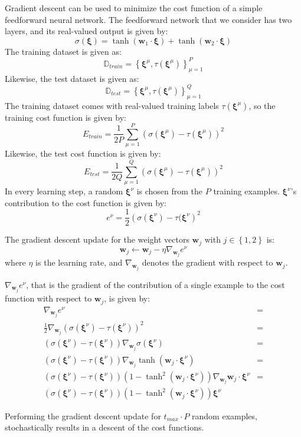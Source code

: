 Gradient descent can be used to minimize the cost function of a simple feedforward neural network.
The feedforward network that we consider has two layers, and its real-valued output is given by:
\[
	\sigma(\pmb{\xi}) = 
	\tanh(\mathbf{w}_1\cdot \pmb{\xi}) + \tanh(\mathbf{w}_2\cdot \pmb{\xi})
\]
The training dataset is given as:
\[
\mathbb{D}_{train} =
	\left\{
		\pmb{\xi}^\mu, \tau(\pmb{\xi}^\mu)
	\right\}_{\mu=1}^{P}
\]
Likewise, the test dataset is given as:
\[
\mathbb{D}_{test} =
	\left\{
		\pmb{\xi}^\mu, \tau(\pmb{\xi}^\mu)
	\right\}_{\mu=1}^{Q}
\]
The training dataset comes with real-valued training labels \(\tau(\pmb{\xi}^\mu)\), so the training cost function is given by:
\[
	E_{train} = 
	\frac{1}{2P}
	\sum_{\mu=1}^P(\sigma(\pmb{\xi}^\mu) - \tau(\pmb{\xi}^\mu))^2
\]
Likewise, the test cost function is given by:
\[
	E_{test} = 
	\frac{1}{2Q}
	\sum_{\mu=1}^Q(\sigma(\pmb{\xi}^\mu) - \tau(\pmb{\xi}^\mu))^2
\]
In every learning step, a random \(\pmb{\xi}^\nu\) is chosen from the \(P\) training examples.
\(\pmb{\xi}^\nu\)'s contribution to the cost function is given by:
\[
	e^\nu = 
	\frac{1}{2}\left(
		\sigma(\pmb{\xi}^\nu) - \tau(\pmb{\xi}^\nu
	\right)^2
\]

The gradient descent update for the weight vectors \(\mathbf{w}_j\) with \(j \in \left\{1, 2\right\}\) is:
\[
	\mathbf{w}_j \leftarrow \mathbf{w}_j - \eta \nabla_{\mathbf{w}_j}e^\nu
\]
where \(\eta\) is the learning rate, and \(\nabla_{\mathbf{w}_j}\) denotes the gradient with respect to \(\mathbf{w}_j\).

\(\nabla_{\mathbf{w}_j}e^\nu\), that is the gradient of the contribution of a single example to the cost function with respect to \(\mathbf{w}_j\), is given by:
\begin{equation} \label{eq:costFunction}
	\begin{split}
		\nabla_{\mathbf{w}_j}e^\nu
		&= \\
		\frac{1}{2} \nabla_{\mathbf{w}_j} \left( 
			\sigma(\pmb{\xi}^\nu) - \tau(\pmb{\xi}^\nu)
		\right)^2
		&= \\
		(\sigma(\pmb{\xi}^\nu) - \tau(\pmb{\xi}^\nu))
		\nabla_{\mathbf{w}_j}
		\sigma(\pmb{\xi}^\nu)
		&= \\
		(\sigma(\pmb{\xi}^\nu) - \tau(\pmb{\xi}^\nu))
		\nabla_{\mathbf{w}_j}
		\tanh(\mathbf{w}_j\cdot\pmb{\xi}^\nu)
		&= \\
		(\sigma(\pmb{\xi}^\nu) - \tau(\pmb{\xi}^\nu))
		(1 - \tanh^2(\mathbf{w}_j\cdot\pmb{\xi}^\nu))
		\nabla_{\mathbf{w}_j}
		\mathbf{w}_j\cdot\pmb{\xi}^\nu
		&= \\
		(\sigma(\pmb{\xi}^\nu) - \tau(\pmb{\xi}^\nu))
		(1 - \tanh^2(\mathbf{w}_j\cdot\pmb{\xi}^\nu))
		\pmb{\xi}^\nu 
	\end{split}
\end{equation}

Performing the gradient descent update for \(t_{max} \cdot P\) random examples, stochastically results in a descent of the cost functions.

\[\]